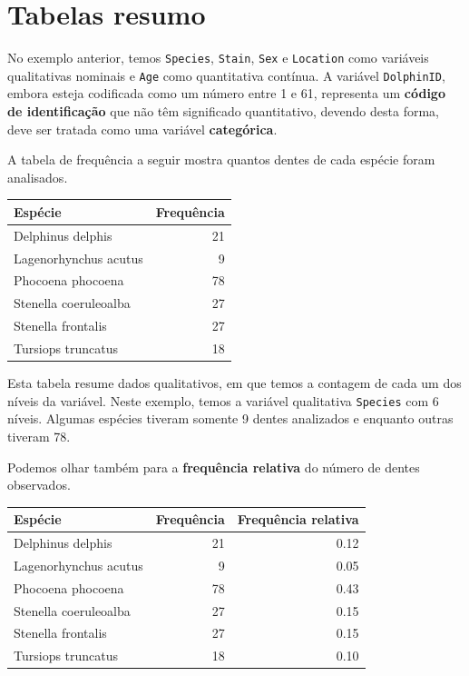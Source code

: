 \documentclass[
]{book}
\begin{document}
\hypertarget{tabelas-resumo}{%
\section{Tabelas resumo}\label{tabelas-resumo}}

No exemplo anterior, temos \texttt{Species}, \texttt{Stain}, \texttt{Sex} e \texttt{Location} como variáveis qualitativas nominais e \texttt{Age} como quantitativa contínua. A variável \texttt{DolphinID}, embora esteja codificada como um número entre 1 e 61, representa um \textbf{código de identificação} que não têm significado quantitativo, devendo desta forma, deve ser tratada como uma variável \textbf{categórica}.

A tabela de frequência a seguir mostra quantos dentes de cada espécie foram analisados.

\begin{tabular}{l|r}
\hline
Espécie & Frequência\\
\hline
Delphinus delphis & 21\\
\hline
Lagenorhynchus acutus & 9\\
\hline
Phocoena phocoena & 78\\
\hline
Stenella coeruleoalba & 27\\
\hline
Stenella frontalis & 27\\
\hline
Tursiops truncatus & 18\\
\hline
\end{tabular}

Esta tabela resume dados qualitativos, em que temos a contagem de cada um dos níveis da variável. Neste exemplo, temos a variável qualitativa \texttt{Species} com 6 níveis. Algumas espécies tiveram somente 9 dentes analizados e enquanto outras tiveram 78.

Podemos olhar também para a \textbf{frequência relativa} do número de dentes observados.

\begin{tabular}{l|r|r}
\hline
Espécie & Frequência & Frequência relativa\\
\hline
Delphinus delphis & 21 & 0.12\\
\hline
Lagenorhynchus acutus & 9 & 0.05\\
\hline
Phocoena phocoena & 78 & 0.43\\
\hline
Stenella coeruleoalba & 27 & 0.15\\
\hline
Stenella frontalis & 27 & 0.15\\
\hline
Tursiops truncatus & 18 & 0.10\\
\hline
\end{tabular}
\end{document}
